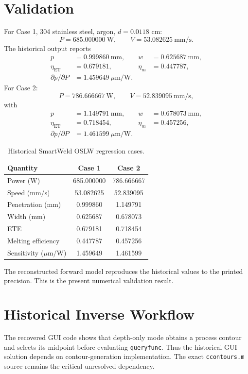 \documentclass[11pt,a4paper]{article}
\begin{document}
\section{Validation}
For Case 1, 304 stainless steel, argon, $d=0.0118$ cm:
\begin{equation}
P=685.000000~\mathrm{W},\qquad V=53.082625~\mathrm{mm/s}.
\end{equation}
The historical output reports
\begin{align}
p&=0.999860~\mathrm{mm},&w&=0.625687~\mathrm{mm},\\
\eta_{\mathrm{ET}}&=0.679181,&\eta_m&=0.447787,\\
\partial p/\partial P&=1.459649~\mu\mathrm{m/W}.
\end{align}
For Case 2:
\begin{equation}
P=786.666667~\mathrm{W},\qquad V=52.839095~\mathrm{mm/s},
\end{equation}
with
\begin{align}
p&=1.149791~\mathrm{mm},&w&=0.678073~\mathrm{mm},\\
\eta_{\mathrm{ET}}&=0.718454,&\eta_m&=0.457256,\\
\partial p/\partial P&=1.461599~\mu\mathrm{m/W}.
\end{align}
\begin{table}[ht]
\centering
\caption{Historical SmartWeld OSLW regression cases.}
\begin{tabular}{lcc}
\hline
Quantity & Case 1 & Case 2\\ \hline
Power (W) & 685.000000 & 786.666667\\
Speed (mm/s) & 53.082625 & 52.839095\\
Penetration (mm) & 0.999860 & 1.149791\\
Width (mm) & 0.625687 & 0.678073\\
ETE & 0.679181 & 0.718454\\
Melting efficiency & 0.447787 & 0.457256\\
Sensitivity ($\mu$m/W) & 1.459649 & 1.461599\\ \hline
\end{tabular}
\end{table}
The reconstructed forward model reproduces the historical values to the printed
precision. This is the present numerical validation result.
\section{Historical Inverse Workflow}
The recovered GUI code shows that depth-only mode obtains a process contour and
selects its midpoint before evaluating \texttt{queryfunc}. Thus the historical
GUI solution depends on contour-generation implementation. The exact
\texttt{ccontours.m} source remains the critical unresolved dependency.
\end{document}

